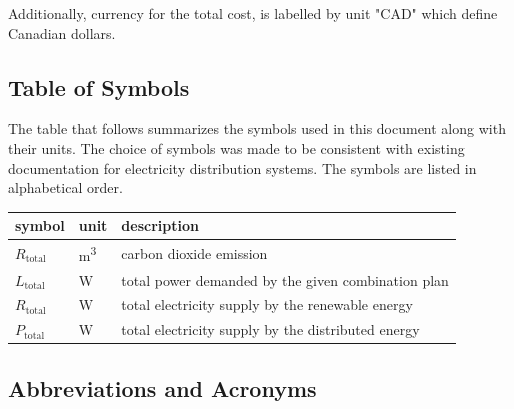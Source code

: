 \documentclass[12pt]{article}
\begin{document}
Additionally, currency for the total cost, is labelled by unit "CAD" which define Canadian dollars.


\subsection{Table of Symbols}

The table that follows summarizes the symbols used in this document along with their units. The choice of symbols was made to be consistent with existing documentation for electricity distribution systems.  The symbols are listed in alphabetical order.

\renewcommand{\arraystretch}{1.2}
\noindent \begin{longtable*}{l l p{12cm}} \toprule
\textbf{symbol} & \textbf{unit} & \textbf{description}\\
\midrule 
$R_\text{total}$ & \si[per-mode=symbol] {\cubic\metre} &carbon dioxide emission\\
$L_\text{total}$ & \si[per-mode=symbol] {\watt} &total power demanded by the given combination plan
\\ 
$R_\text{total}$ & \si[per-mode=symbol] {\watt} &total electricity supply by the renewable energy\\
$P_\text{total}$ & \si[per-mode=symbol] {\watt} &total electricity supply by the distributed energy\\
\bottomrule
\end{longtable*}

\subsection{Abbreviations and Acronyms}
\end{document}
